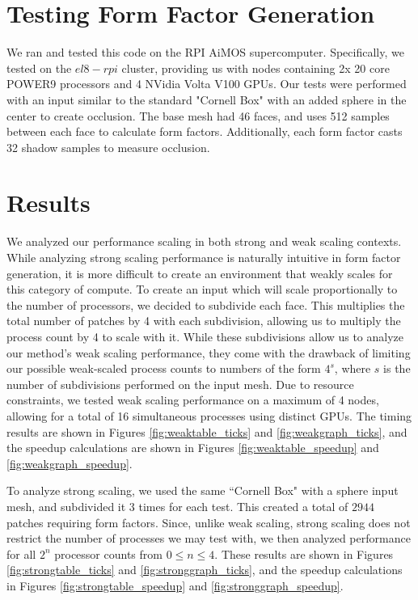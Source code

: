 \documentclass[conference]{IEEEtran}
\begin{document}
\section{Testing Form Factor Generation}
We ran and tested this code on the RPI AiMOS supercomputer. Specifically, we tested on the $el8-rpi$ cluster, providing us with nodes containing 2x 20 core POWER9 processors and 4 NVidia Volta V100 GPUs. 
Our tests were performed with an input similar to the standard "Cornell Box" \cite{b1} with an added sphere in the center to create occlusion. The base mesh had 46 faces, and uses 512 samples between each face to calculate form factors. Additionally, each form factor casts 32 shadow samples to measure occlusion.

\section{Results}
We analyzed our performance scaling in both strong and weak scaling contexts. While analyzing strong scaling performance is naturally intuitive in form factor generation, it is more difficult to create an environment that weakly scales for this category of compute. To create an input which will scale proportionally to the number of processors, we decided to subdivide each face. This multiplies the total number of patches by 4 with each subdivision, allowing us to multiply the process count by 4 to scale with it. While these subdivisions allow us to analyze our method's weak scaling performance, they come with the drawback of limiting our possible weak-scaled process counts to numbers of the form $4^s$, where $s$ is the number of subdivisions performed on the input mesh. Due to resource constraints, we tested weak scaling performance on a maximum of 4 nodes, allowing for a total of 16 simultaneous processes using distinct GPUs. The timing results are shown in Figures \ref{fig:weaktable_ticks} and \ref{fig:weakgraph_ticks}, and the speedup calculations are shown in Figures \ref{fig:weaktable_speedup} and \ref{fig:weakgraph_speedup}.

To analyze strong scaling, we used the same ``Cornell Box" with a sphere input mesh, and subdivided it 3 times for each test. This created a total of $2944$ patches requiring form factors. Since, unlike weak scaling, strong scaling does not restrict the number of processes we may test with, we then analyzed performance for all $2^n$ processor counts from $0\leq n \leq 4$. These results are shown in Figures \ref{fig:strongtable_ticks} and \ref{fig:stronggraph_ticks}, and the speedup calculations in Figures \ref{fig:strongtable_speedup} and \ref{fig:stronggraph_speedup}.
\end{document}
